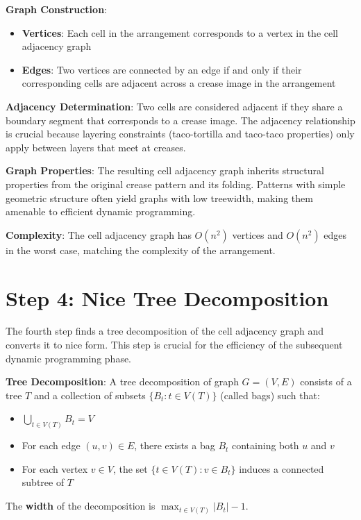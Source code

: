 \textbf{Graph Construction}:
\begin{itemize}
\item \textbf{Vertices}: Each cell in the arrangement corresponds to a vertex in the cell adjacency graph
\item \textbf{Edges}: Two vertices are connected by an edge if and only if their corresponding cells are adjacent across a crease image in the arrangement
\end{itemize}

\textbf{Adjacency Determination}: Two cells are considered adjacent if they share a boundary segment that corresponds to a crease image. The adjacency relationship is crucial because layering constraints (taco-tortilla and taco-taco properties) only apply between layers that meet at creases.

\textbf{Graph Properties}: The resulting cell adjacency graph inherits structural properties from the original crease pattern and its folding. Patterns with simple geometric structure often yield graphs with low treewidth, making them amenable to efficient dynamic programming.

\textbf{Complexity}: The cell adjacency graph has $O(n^2)$ vertices and $O(n^2)$ edges in the worst case, matching the complexity of the arrangement.

\section{Step 4: Nice Tree Decomposition}

The fourth step finds a tree decomposition of the cell adjacency graph and converts it to nice form. This step is crucial for the efficiency of the subsequent dynamic programming phase.

\textbf{Tree Decomposition}: A tree decomposition of graph $G = (V, E)$ consists of a tree $T$ and a collection of subsets $\{B_t : t \in V(T)\}$ (called bags) such that:
\begin{itemize}
\item $\bigcup_{t \in V(T)} B_t = V$
\item For each edge $(u,v) \in E$, there exists a bag $B_t$ containing both $u$ and $v$
\item For each vertex $v \in V$, the set $\{t \in V(T) : v \in B_t\}$ induces a connected subtree of $T$
\end{itemize}

The \textbf{width} of the decomposition is $\max_{t \in V(T)} |B_t| - 1$.

